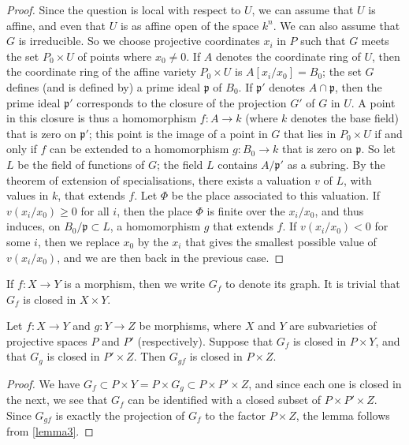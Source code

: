 \documentclass[10pt]{article}
\theoremstyle{plain}
\newenvironment{lemma}[1]
  {\renewcommand\theinnercustomlemma{#1}\innercustomlemma}
  {\endinnercustomlemma}
\theoremstyle{definition}
\renewcommand{\geq}{\geqslant}
\newcommand{\oldpage}[1]{\marginpar{\textit{p.~#1}}}
\begin{document}
\begin{proof}
  Since the question is local with respect to $U$, we can assume that $U$ is affine, and even that $U$ is as affine open of the space $k^n$.
  We can also assume that $G$ is irreducible.
  So we choose projective coordinates $x_i$ in $P$ such that $G$ meets the set $P_0\times U$ of points where $x_0\neq0$.
  If $A$ denotes the coordinate ring of $U$, then the coordinate ring of the affine variety $P_0\times U$ is $A[x_i/x_0]=B_0$;
  the set $G$ defines (and is defined by) a prime ideal $\mathfrak{p}$ of $B_0$.
  If $\mathfrak{p}'$ denotes $A\cap\mathfrak{p}$, then the prime ideal $\mathfrak{p}'$ corresponds to the closure of the projection $G'$ of $G$ in $U$.
  A point in this closure is thus a homomorphism $f\colon A\to k$ (where $k$ denotes the base field) that is zero on $\mathfrak{p}'$;
\oldpage{100}
  this point is the image of a point in $G$ that lies in $P_0\times U$ if and only if $f$ can be extended to a homomorphism $g\colon B_0\to k$ that is zero on $\mathfrak{p}$.
  So let $L$ be the field of functions of $G$;
  the field $L$ contains $A/\mathfrak{p}'$ as a subring.
  By the theorem of extension of specialisations, there exists a valuation $v$ of $L$, with values in $k$, that extends $f$.
  Let $\Phi$ be the place associated to this valuation.
  If $v(x_i/x_0)\geq0$ for all $i$, then the place $\Phi$ is finite over the $x_i/x_0$, and thus induces, on $B_0/\mathfrak{p}\subset L$, a homomorphism $g$ that extends $f$.
  If $v(x_i/x_0)<0$ for some $i$, then we replace $x_0$ by the $x_i$ that gives the smallest possible value of $v(x_i/x_0)$, and we are then back in the previous case.
\end{proof}

If $f\colon X\to Y$ is a morphism, then we write $G_f$ to denote its graph.
It is trivial that $G_f$ is closed in $X\times Y$.

\begin{lemma}{4}
\label{lemma4}
  Let $f\colon X\to Y$ and $g\colon Y\to Z$ be morphisms, where $X$ and $Y$ are subvarieties of projective spaces $P$ and $P'$ (respectively).
  Suppose that $G_f$ is closed in $P\times Y$, and that $G_g$ is closed in $P'\times Z$.
  Then $G_{gf}$ is closed in $P\times Z$.
\end{lemma}

\begin{proof}
  We have $G_f \subset P\times Y = P\times G_g \subset P\times P'\times Z$, and since each one is closed in the next, we see that $G_f$ can be identified with a closed subset of $P\times P'\times Z$.
  Since $G_{gf}$ is exactly the projection of $G_f$ to the factor $P\times Z$, the lemma follows from \cref{lemma3}.
\end{proof}
\end{document}
